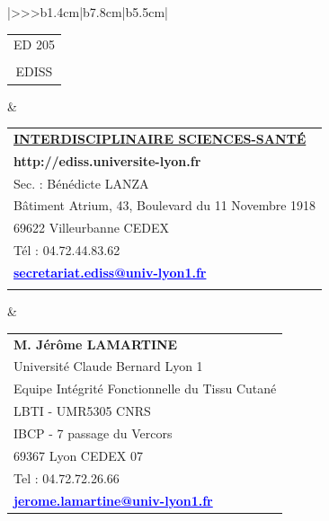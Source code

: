 \begin{center}
\begin{tabular}{|>{\centering}>{}>{\color{txtED}}b{1.4cm}|b{7.8cm}|b{5.5cm}|}
\hline	
	\begin{tabular}{@{}c@{}}
		ED 205\\
		\\
		EDISS\end{tabular}&
	\begin{tabular}{@{}l@{}}
		\\
		\textbf{\underline{INTERDISCIPLINAIRE SCIENCES-SANTÉ}}\\[.2cm]
		\textcolor{siteED}{\textbf{http://ediss.universite-lyon.fr}}\\
		Sec. : Bénédicte LANZA\\
		Bâtiment Atrium, 43, Boulevard du 11 Novembre 1918\\
		69622 Villeurbanne CEDEX\\
		Tél : 04.72.44.83.62\\
		\textcolor{blue}{\underline{\textbf{secretariat.ediss@univ-lyon1.fr}}}\\
		\\
	\end{tabular}&
	\begin{tabular}{@{}l@{}}
		\textcolor{txtED}{\textbf{M. Jérôme LAMARTINE}}\\
		Université Claude Bernard Lyon 1\\
		Equipe Intégrité Fonctionnelle du Tissu Cutané\\
		LBTI - UMR5305 CNRS\\
		IBCP - 7 passage du Vercors\\
                69367 Lyon CEDEX 07\\
		Tel : 04.72.72.26.66\\
		\textcolor{blue}{\underline{\textbf{jerome.lamartine@univ-lyon1.fr}}}\\
	\end{tabular}\\
		

\end{tabular}
\end{center}

